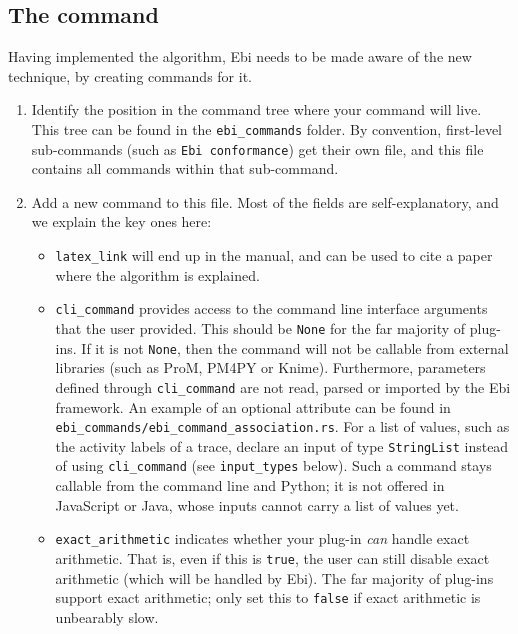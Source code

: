 \documentclass{book}
\begin{document}
		\subsection{The command}
			Having implemented the algorithm, Ebi needs to be made aware of the new technique, by creating commands for it.
			
			\begin{enumerate}
				\item Identify the position in the command tree where your command will live.
				This tree can be found in the \verb=ebi_commands= folder.
				By convention, first-level sub-commands (such as \verb=Ebi conformance=) get their own file, and this file contains all commands within that sub-command.
				
				\item Add a new command to this file.
				Most of the fields are self-explanatory, and we explain the key ones here:
				\begin{itemize}
					\item \verb=latex_link= will end up in the manual, and can be used to cite a paper where the algorithm is explained.
					
					\item \verb=cli_command= provides access to the command line interface arguments that the user provided.
					This should be \verb=None= for the far majority of plug-ins.
					If it is not \verb=None=, then the command will not be callable from external libraries (such as ProM, PM4PY or Knime).
					Furthermore, parameters defined through \verb=cli_command= are not read, parsed or imported by the Ebi framework.
						An example of an optional attribute can be found in \verb=ebi_commands/ebi_command_association.rs=.
					For a list of values, such as the activity labels of a trace, declare an input of type \verb=StringList= instead of using \verb=cli_command= (see \verb=input_types= below).
						Such a command stays callable from the command line and Python; it is not offered in JavaScript or Java, whose inputs cannot carry a list of values yet.
					
					\item \verb=exact_arithmetic= indicates whether your plug-in \emph{can} handle exact arithmetic. 
					That is, even if this is \verb=true=, the user can still disable exact arithmetic (which will be handled by Ebi).
					The far majority of plug-ins support exact arithmetic; only set this to \verb=false= if exact arithmetic is unbearably slow.
					

\end{itemize}
\end{enumerate}
\end{document}
